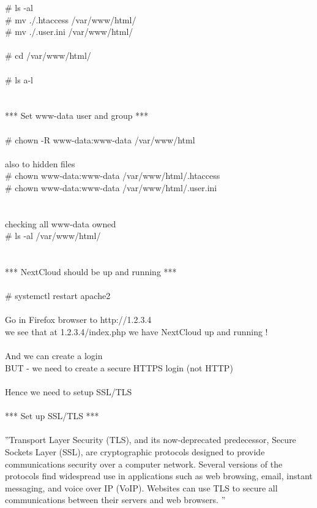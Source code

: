 \documentclass[10pt,a4paper]{article}
\begin{document}
{	\# ls -al\\
	\# mv ./.htaccess /var/www/html/}{\large \\
	\# mv ./.user.ini /var/www/html/}{\large \\
\\
	\# cd /var/www/html/}{\large \\
\\
	\# ls a-l\\
\\
\\
*** Set www-data user and group ***\\
\\
	\# chown -R www-data:www-data /var/www/html}{\large \\
\\
	also to hidden files\\
	\# chown www-data:www-data /var/www/html/.htaccess}{\large \\
	\# chown www-data:www-data /var/www/html/.user.ini}{\large \\
\\
	\\
	checking all www-data owned\\
	\# ls -al /var/www/html/}{\large \\
\\
\\
*** NextCloud should be up and running ***\\
	\\
	\# systemctl restart apache2\\
\\
	Go in Firefox browser to http://1.2.3.4}{\large \\
	we see that at 1.2.3.4/index.php we have NextCloud up and running !\\
\\
	And we can create a login\\
	BUT - we need to create a secure HTTPS login (not HTTP)\\
\\
	Hence we need to setup SSL/TLS\\
\\
*** Set up SSL/TLS ***\\
\\
''Transport Layer Security (TLS), and its now-deprecated predecessor, Secure Sockets Layer (SSL), are cryptographic protocols designed to provide communications security over a computer network. Several versions of the protocols find widespread use in applications such as web browsing, email, instant messaging, and voice over IP (VoIP). Websites can use TLS to secure all communications between their servers and web browsers. ''\\
}
\end{document}
